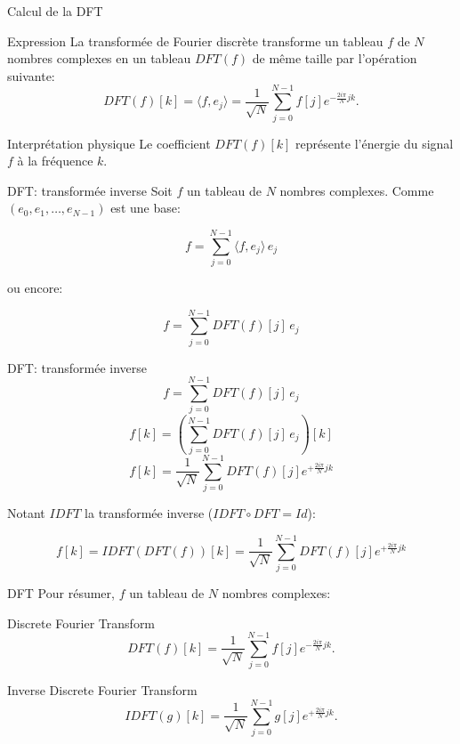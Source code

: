 \begin{frame}{Calcul de la DFT}
	\begin{alertblock}{Expression}
	La transformée de Fourier discrète transforme un tableau $f$ de $N$ nombres complexes en un tableau $DFT(f)$ de même taille par l'opération suivante:
	\[DFT(f)[k] = \langle f,e_j \rangle =  \frac{1}{\sqrt{N}}\sum_{j=0}^{N-1}f[j]e^{-\frac{2i\pi}{N} jk}.\]
	\end{alertblock}
	
	\begin{exampleblock}{Interprétation physique}
	Le coefficient $DFT(f)[k]$ représente l'énergie du signal $f$ à la fréquence $k$. 
	\end{exampleblock}
\end{frame}

\begin{frame}{DFT: transformée inverse}
Soit $f$ un tableau de $N$ nombres complexes.
Comme $(e_0,e_1,\dots, e_{N-1})$ est une base:

\[f = \sum_{j=0}^{N-1} \langle f,e_j \rangle \, e_j\]

ou encore:

\[f = \sum_{j=0}^{N-1} DFT(f)[j] \, e_j\]

\end{frame}
\begin{frame}{DFT: transformée inverse}
\[f = \sum_{j=0}^{N-1} DFT(f)[j] \, e_j\]
\[f[k] = \left( \sum_{j=0}^{N-1} DFT(f)[j] \, e_j \right) [k] \]
\[f[k] = 
\frac{1}{\sqrt{N}}  \sum_{j=0}^{N-1} DFT(f)[j] e^{+\frac{2i\pi}{N} jk}  \]

Notant $IDFT$ la transformée inverse ($IDFT\circ DFT = Id$):

\[f[k] =  IDFT(DFT(f))[k] = \frac{1}{\sqrt{N}}  \sum_{j=0}^{N-1} DFT(f)[j] e^{+\frac{2i\pi}{N} jk} \]
\end{frame}

\begin{frame}{DFT}
Pour résumer, $f$ un tableau de $N$ nombres complexes:
\begin{alertblock}{Discrete Fourier Transform}
\[DFT(f)[k] =  \frac{1}{\sqrt{N}}\sum_{j=0}^{N-1}f[j]e^{-\frac{2i\pi}{N} jk}.\]
\end{alertblock}
\begin{alertblock}{Inverse Discrete Fourier Transform}
\[IDFT(g)[k] =  \frac{1}{\sqrt{N}}\sum_{j=0}^{N-1}g[j]e^{+\frac{2i\pi}{N} jk}.\]
\end{alertblock}
\end{frame}


